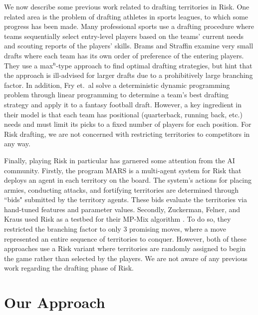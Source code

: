 \documentclass[letterpaper]{article}
\numberwithin{equation}{section}
\numberwithin{theorem}{section}
\numberwithin{lemma}{section}
\numberwithin{df}{section}
\begin{document}
We now describe some previous work related to drafting territories in Risk.  One related area is the problem of drafting athletes in sports leagues, to which some progress has been made.  Many professional sports use a drafting procedure where teams sequentially select entry-level players based on the teams' current needs and scouting reports of the players' skills.  Brams and Straffin \cite{PrisonAndDrafting} examine very small drafts where each team has its own order of preference of the entering players.  They use a max$^\text{n}$-type approach to find optimal drafting strategies, but hint that the approach is ill-advised for larger drafts due to a prohibitively large branching factor.  In addition, Fry et.~al \cite{SportsDrafting} solve a deterministic dynamic programming problem through linear programming to determine a team's best drafting strategy and apply it to a fantasy football draft.  However, a key ingredient in their model is that each team has positional (quarterback, running back, etc.) needs and must limit its picks to a fixed number of players for each position.  For Risk drafting, we are not concerned with restricting territories to competitors in any way.

Finally, playing Risk in particular has garnered some attention from the AI community.  Firstly, the program MARS \cite{RiskBots} is a multi-agent system for Risk that deploys an agent in each territory on the board.  The system's actions for placing armies, conducting attacks, and fortifying territories are determined through ``bids" submitted by the territory agents.  These bids evaluate the territories via hand-tuned features and parameter values.  Secondly, Zuckerman, Felner, and Kraus used Risk as a testbed for their MP-Mix algorithm \cite{ZuckFelnerKraus2009}.  To do so, they restricted the branching factor to only 3 promising moves, where a move represented an entire sequence of territories to conquer.  However, both of these approaches use a Risk variant where territories are randomly assigned to begin the game rather than selected by the players.  We are not aware of any previous work regarding the drafting phase of Risk.

\section{Our Approach}

\end{document}
